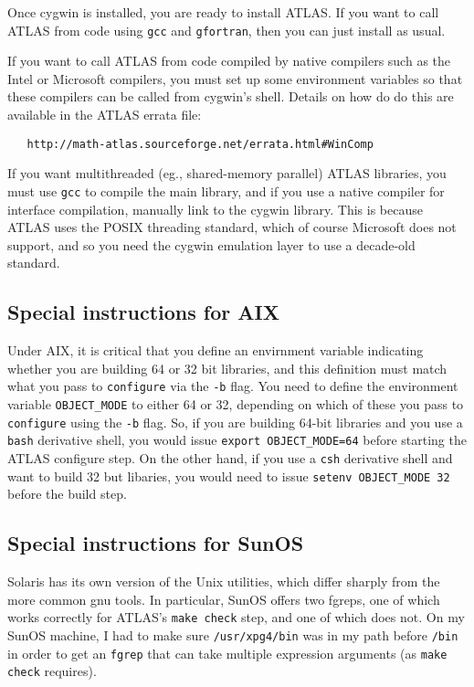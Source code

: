 \documentclass[11pt]{article}
\begin{document}
Once cygwin is installed, you are ready to install ATLAS.  If you want
to call ATLAS from code using {\tt gcc} and {\tt gfortran}, then you
can just install as usual.  

If you want to call ATLAS from code compiled by native compilers such
as the Intel or Microsoft compilers, you must set up some environment
variables so that these compilers can be called from cygwin's shell.
Details on how do do this are available in the ATLAS errata file:
\vspace*{-0.1in}
\begin{verbatim}
   http://math-atlas.sourceforge.net/errata.html#WinComp
\end{verbatim}

If you want multithreaded (eg., shared-memory parallel) ATLAS libraries,
you must use {\tt gcc} to compile the main library, and if you use a native
compiler for interface compilation, manually link to the cygwin library.
This is because
ATLAS uses the POSIX threading standard, which of course Microsoft
does not support, and so you need the cygwin emulation layer to use
a decade-old standard.

\subsection{Special instructions for AIX}
Under AIX, it is critical that you define an envirnment variable
indicating whether you are building 64 or 32 bit libraries, and
this definition must match what you pass to {\tt configure} via the
{\tt -b} flag.  You need to define the environment variable
{\tt OBJECT\_MODE} to either 64 or 32, depending on which of
these you pass to {\tt configure} using the {\tt -b} flag.  So, if you
are building 64-bit libraries and you use a {\tt bash} derivative
shell, you would issue {\tt export OBJECT\_MODE=64} before starting
the ATLAS configure step.  On the other hand, if you use a {\tt csh}
derivative shell and want to build 32 but libaries, you would need
to issue {\tt setenv OBJECT\_MODE 32} before the build step.

\subsection{Special instructions for SunOS}
Solaris has its own version of the Unix utilities, which differ sharply
from the more common gnu tools.  In particular, SunOS offers two fgreps,
one of which works correctly for ATLAS's {\tt make check} step, and
one of which does not.  On my SunOS machine, I had to make sure
{\tt /usr/xpg4/bin} was in my path before {\tt /bin} in order
to get an {\tt fgrep} that can take multiple expression arguments
(as {\tt make check} requires).
\end{document}
